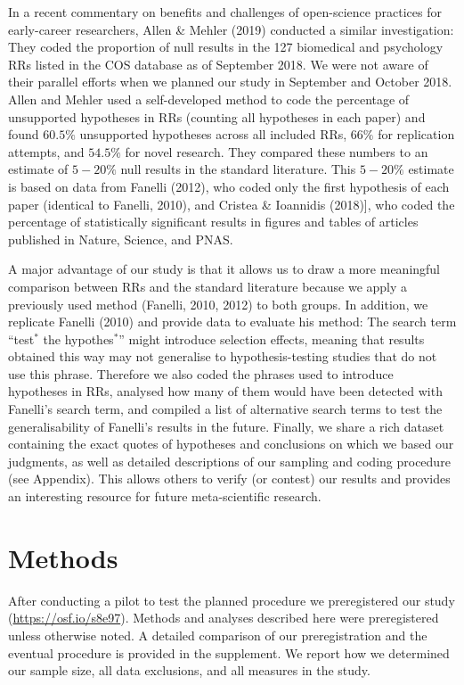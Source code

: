 \documentclass[british,,man,floatsintext]{apa6}
\begin{document}
In a recent commentary on benefits and challenges of open-science practices for early-career researchers, Allen \& Mehler (2019) conducted a similar investigation:
They coded the proportion of null results in the 127 biomedical and psychology RRs listed in the COS database as of September 2018.
We were not aware of their parallel efforts when we planned our study in September and October 2018.
Allen and Mehler used a self-developed method to code the percentage of unsupported hypotheses in RRs (counting all hypotheses in each paper) and found \(60.5\%\) unsupported hypotheses across all included RRs, \(66\%\) for replication attempts, and \(54.5\%\) for novel research.
They compared these numbers to an estimate of \(5-20\%\) null results in the standard literature.
This \(5-20\%\) estimate is based on data from Fanelli (2012), who coded only the first hypothesis of each paper (identical to Fanelli, 2010), and Cristea \& Ioannidis (2018){]}, who coded the percentage of statistically significant results in figures and tables of articles published in Nature, Science, and PNAS.

A major advantage of our study is that it allows us to draw a more meaningful comparison between RRs and the standard literature because we apply a previously used method (Fanelli, 2010, 2012) to both groups.
In addition, we replicate Fanelli (2010) and provide data to evaluate his method: The search term \enquote{test\(^\ast\) the hypothes\(^\ast\)} might introduce selection effects, meaning that results obtained this way may not generalise to hypothesis-testing studies that do not use this phrase.
Therefore we also coded the phrases used to introduce hypotheses in RRs, analysed how many of them would have been detected with Fanelli's search term, and compiled a list of alternative search terms to test the generalisability of Fanelli's results in the future.
Finally, we share a rich dataset containing the exact quotes of hypotheses and conclusions on which we based our judgments, as well as detailed descriptions of our sampling and coding procedure (see Appendix).
This allows others to verify (or contest) our results and provides an interesting resource for future meta-scientific research.

\hypertarget{methods}{%
\section{Methods}\label{methods}}

After conducting a pilot to test the planned procedure we preregistered our study (\url{https://osf.io/s8e97}).
Methods and analyses described here were preregistered unless otherwise noted.
A detailed comparison of our preregistration and the eventual procedure is provided in the supplement.
We report how we determined our sample size, all data exclusions, and all measures in the study.
\end{document}
